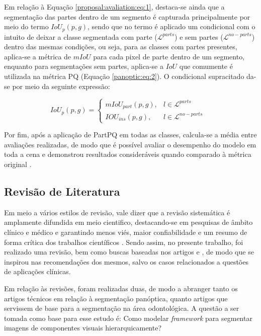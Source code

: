 Em relação à Equação \ref{proposal:avaliation:eq:1}, destaca-se ainda que a segmentação das partes dentro de um segmento é capturada principalmente por meio do termo $IoU_p(p,g)$, sendo que no termo é aplicado um condicional com o intuito de deixar a classe segmentada com parte ($\mathcal{L}^{parts}$) e sem partes ($\mathcal{L}^{no-parts}$) dentro das mesmas condições, ou seja, para as classes com partes presentes, aplica-se a métrica de $mIoU$ para cada pixel de parte dentro de um segmento, enquanto para segmentações sem partes, aplica-se a $IoU$ que comumente é utilizada na métrica PQ (Equação \ref{panoptic:eq:2}). O condicional supracitado da-se por meio da seguinte expressão:

\begin{equation}
\label{proposal:avaliation:eq:2}
    IoU_p(p,g)= \left\{\begin{matrix}
        mIoU_{part}(p,g), & l \in \mathcal{L}^{parts}    & \\ 
        IOU_{ins}(p,g),        & l \in \mathcal{L}^{no-parts} & 
    \end{matrix}\right.
\end{equation}

Por fim, após a aplicação de PartPQ em todas as classes, calcula-se a média entre avaliações realizadas, de modo que é possível avaliar o desempenho do modelo em toda a cena e demonstrou resultados consideráveis quando comparado à métrica original \cite{DeGeus2021}.


\subsection{Revisão de Literatura}
\label{proposal:revision}
Em meio a vários estilos de revisão, vale dizer que a revisão sistemática é amplamente difundida em meio cientifico, destacando-se em pesquisas de âmbito clínico e médico e garantindo menos viés, maior confiabilidade e um resumo de forma crítica dos trabalhos científicos \cite{barbosa2019}. Sendo assim, no presente trabalho, foi realizado uma revisão, bem como buscas baseadas nos artigos \cite{barbosa2019} e \cite{liberati2009}, de modo que se inspirou nas recomendações dos mesmos, salvo os casos relacionados a questões de aplicações clínicas.

Em relação às revisões, foram realizadas duas, de modo a abranger tanto os artigos técnicos em relação à segmentação panóptica, quanto artigos que servissem de base para a segmentação na área odontológica. A questão a ser tomada como base para esse estudo é: Como modelar \textit{framework} para segmentar imagens de componentes visuais hierarquicamente?


